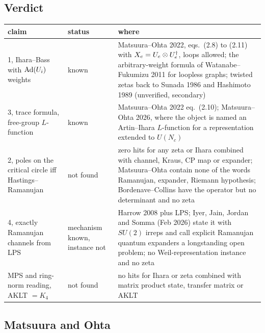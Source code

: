 \subsection{Verdict}

{\small
\begin{tabular}{@{}p{3.9cm}p{2.5cm}p{7.6cm}@{}}
\toprule
claim & status & where \\
\midrule
1, Ihara--Bass with $\operatorname{Ad}(U_{i})$ weights & known &
Matsuura--Ohta 2022, eqs.\ (2.8) to (2.11) with
$X_e = U_{e}\otimes U_{e}^\dagger$, loops allowed; the arbitrary-weight
formula of Watanabe--Fukumizu 2011 for loopless graphs; twisted zetas back to
Sunada 1986 and Hashimoto 1989 (unverified, secondary) \\
3, trace formula, free-group $L$-function & known &
Matsuura--Ohta 2022 eq.\ (2.10); Matsuura--Ohta 2026, where the object is
named an Artin--Ihara $L$-function for a representation extended to $U(N_c)$ \\
2, poles on the critical circle iff Hastings--Ramanujan & not found &
zero hits for any zeta or Ihara combined with channel, Kraus, CP map or
expander; Matsuura--Ohta contain none of the words Ramanujan, expander,
Riemann hypothesis; Bordenave--Collins have the operator but no determinant
and no zeta \\
4, exactly Ramanujan channels from LPS & mechanism known, instance not &
Harrow 2008 plus LPS; Iyer, Jain, Jordan and Somma (Feb 2026) state it with
$SU(2)$ irreps and call explicit Ramanujan quantum expanders a longstanding
open problem; no Weil-representation instance and no zeta \\
MPS and ring-norm reading, AKLT $= K_4$ & not found &
no hits for Ihara or zeta combined with matrix product state, transfer matrix
or AKLT \\
\bottomrule
\end{tabular}}

\subsection{Matsuura and Ohta}


